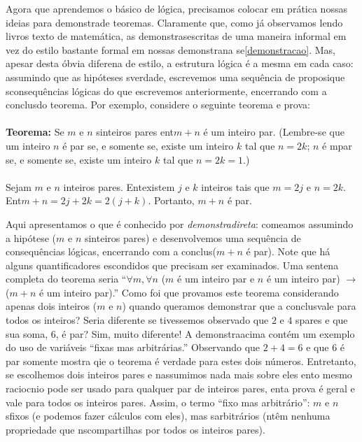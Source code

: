 Agora que aprendemos o b\'asico de l\'ogica, precisamos colocar em pr\'atica nossas ideias para demonstra\cao de teoremas. Claramente que, como j\'a observamos lendo livros texto de matem\'atica, as demonstra\coes s\ao escritas de uma maneira informal em vez do estilo bastante formal em nossas demonstra\coes na se\cao \ref{demonstracao}. Mas, apesar desta \'obvia diferen\cc a de estilo, a estrutura l\'ogica \'e a mesma em cada caso: assumindo que as hip\'oteses s\ao verdade, escrevemos uma sequ\^encia de proposi\coes que s\ao consequ\^encias l\'ogicas do que escrevemos anteriormente, encerrando com a conclus\ao do teorema. Por exemplo, considere o seguinte teorema e prova:
\\
\\
{\bf Teorema:} Se $m$ e $n$ s\ao inteiros pares ent\ao $m+n$ \'e um inteiro par. (Lembre-se que um inteiro $n$ \'e par se, e somente se, existe um inteiro $k$ tal que $n=2k$; $n$ \'e \ih mpar se, e somente se, existe um inteiro $k$ tal que $n=2k=1$.)
\\
\\
{\demo} Sejam $m$ e $n$ inteiros pares. Ent\ao existem $j$ e $k$ inteiros tais que $m=2j$ e $n=2k$. Ent\ao $m+n=2j+2k=2(j+k)$. Portanto, $m+n$ \'e par. \fim

Aqui apresentamos o que \'e conhecido por \emph{demonstra\cao direta}: come\cc amos assumindo a hip\'otese ($m$ e $n$ s\ao inteiros pares) e desenvolvemos uma sequ\^encia de consequ\^encias l\'ogicas, encerrando com a conclus\ao ($m+n$ \'e par). Note que h\'a alguns quantificadores escondidos que precisam ser examinados. Uma senten\cc a completa do teorema seria ``$\forall m, \forall n$ ($m$ \'e um inteiro par e $n$ \'e um inteiro par) $\to$ ($m+n$ \'e um inteiro par).'' Como foi que provamos este teorema considerando apenas dois inteiros ($m$ e $n$) quando quer\ih amos demonstrar que a conclus\ao vale para todos os inteiros? Seria diferente se tivessemos observado que $2$ e $4$ s\ao pares e que sua soma, $6$, \'e par? Sim, muito diferente! A demonstra\cao acima cont\'em um exemplo do uso de vari\'aveis ``fixas mas arbitr\'arias.'' Observando que $2+4=6$ e que $6$ \'e par somente mostra qie o teorema \'e verdade para estes dois n\'umeros. Entretanto, se escolhemos dois inteiros pares e n\ao assumimos nada mais sobre eles ent\ao o mesmo racioc\ih nio pode ser usado para qualquer par de inteiros pares, ent\ao a prova \'e geral e vale para todos os inteiros pares. Assim, o termo ``fixo mas arbitr\'ario'': $m$ e $n$ s\ao fixos (e podemos fazer c\'alculos com eles), mas s\ao arbitr\'arios (n\ao t\^em nenhuma propriedade que n\ao s\ao compartilhas por todos os inteiros pares).

